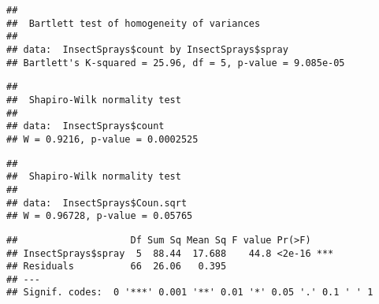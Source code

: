 \documentclass[
]{article}
\newenvironment{Shaded}{\begin{snugshade}}{\end{snugshade}}
\newcommand{\FunctionTok}[1]{\textcolor[rgb]{0.00,0.00,0.00}{#1}}
\newcommand{\NormalTok}[1]{#1}
\newcommand{\OtherTok}[1]{\textcolor[rgb]{0.56,0.35,0.01}{#1}}
\newcommand{\SpecialCharTok}[1]{\textcolor[rgb]{0.00,0.00,0.00}{#1}}
\begin{document}
\begin{Shaded}
\end{Shaded}

\begin{verbatim}
## 
##  Bartlett test of homogeneity of variances
## 
## data:  InsectSprays$count by InsectSprays$spray
## Bartlett's K-squared = 25.96, df = 5, p-value = 9.085e-05
\end{verbatim}

\begin{Shaded}
\end{Shaded}

\begin{verbatim}
## 
##  Shapiro-Wilk normality test
## 
## data:  InsectSprays$count
## W = 0.9216, p-value = 0.0002525
\end{verbatim}

\begin{Shaded}
\end{Shaded}

\begin{verbatim}
## 
##  Shapiro-Wilk normality test
## 
## data:  InsectSprays$Coun.sqrt
## W = 0.96728, p-value = 0.05765
\end{verbatim}

\begin{Shaded}
\end{Shaded}

\begin{verbatim}
##                    Df Sum Sq Mean Sq F value Pr(>F)    
## InsectSprays$spray  5  88.44  17.688    44.8 <2e-16 ***
## Residuals          66  26.06   0.395                   
## ---
## Signif. codes:  0 '***' 0.001 '**' 0.01 '*' 0.05 '.' 0.1 ' ' 1
\end{verbatim}
\end{document}

